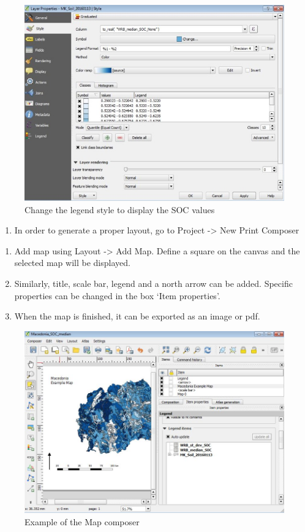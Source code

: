 \documentclass[10pt,b5paper,]{book}
\providecommand{\tightlist}{%
  \setlength{\itemsep}{0pt}\setlength{\parskip}{0pt}}
\theoremstyle{definition}
\theoremstyle{definition}
\theoremstyle{definition}
\theoremstyle{remark}
\begin{document}
\begin{figure}

{\centering \includegraphics[width=0.8\linewidth]{images/Conv_upscaling7} 

}

\caption{Change the legend style to display the SOC values}\label{fig:unnamed-chunk-33}
\end{figure}

\begin{enumerate}
\def\labelenumi{\arabic{enumi}.}
\setcounter{enumi}{8}
\tightlist
\item
  In order to generate a proper layout, go to Project -\textgreater{}
  New Print Composer
\end{enumerate}

\begin{enumerate}
\def\labelenumi{\alph{enumi}.}
\tightlist
\item
  Add map using Layout -\textgreater{} Add Map. Define a square on the
  canvas and the selected map will be displayed.
\item
  Similarly, title, scale bar, legend and a north arrow can be added.
  Specific properties can be changed in the box `Item properties'.
\item
  When the map is finished, it can be exported as an image or pdf.
\end{enumerate}

\begin{figure}

{\centering \includegraphics[width=0.8\linewidth]{images/Conv_upscaling8} 

}

\caption{Example of the Map composer}\label{fig:unnamed-chunk-34}
\end{figure}
\end{document}
